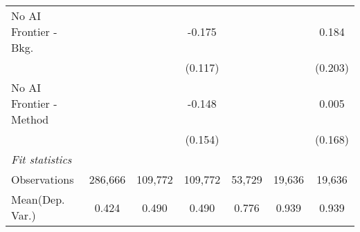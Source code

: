 \begin{tabular}{lcccccc}
   No AI Frontier - Bkg.   &         &         & -0.175       &         &         & 0.184\\   
                           &         &         & (0.117)      &         &         & (0.203)\\   
   No AI Frontier - Method &         &         & -0.148       &         &         & 0.005\\   
                           &         &         & (0.154)      &         &         & (0.168)\\   
   \midrule
   \emph{Fit statistics}\\
   Observations            & 286,666 & 109,772 & 109,772      & 53,729  & 19,636  & 19,636\\  
Mean(Dep. Var.) & 0.424 & 0.490 & 0.490 & 0.776 & 0.939 & 0.939 \\
   

\end{tabular}
